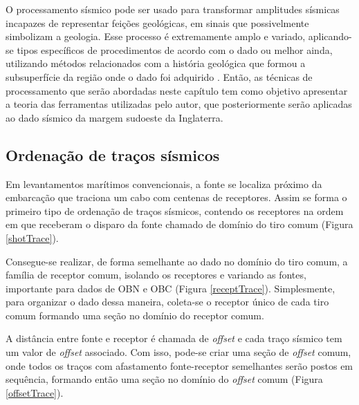 \documentclass[
	12pt,				%
	openright,			%
	oneside,			%
	a4paper,			%
	english,			%
	brazil				%
	]{abntex2}
\begin{document}
    O processamento sísmico pode ser usado para transformar amplitudes sísmicas incapazes de representar feições geológicas, em sinais que possivelmente simbolizam a geologia. Esse processo é extremamente amplo e variado, aplicando-se tipos específicos de procedimentos de acordo com o dado ou melhor ainda, utilizando métodos relacionados com a história geológica que formou a subsuperfície da região onde o dado foi adquirido \cite{yilmaz2001seismic}. Então, as técnicas de processamento que serão abordadas neste capítulo tem como objetivo apresentar a teoria das ferramentas utilizadas pelo autor, que posteriormente serão aplicadas ao dado sísmico da margem sudoeste da Inglaterra.   
	
    \subsection*{Ordenação de traços sísmicos}

    Em levantamentos marítimos convencionais, a fonte se localiza próximo da embarcação que traciona um cabo com centenas de receptores. Assim se forma o primeiro tipo de ordenação de traços sísmicos, contendo os receptores na ordem em que receberam o disparo da fonte chamado de domínio do tiro comum (Figura \ref{shotTrace}).
        
    Consegue-se realizar, de forma semelhante ao dado no domínio do tiro comum, a família de receptor comum, isolando os receptores e variando as fontes, importante para dados de OBN e OBC (Figura \ref{receptTrace}). Simplesmente, para organizar o dado dessa maneira, coleta-se o receptor único de cada tiro comum formando uma seção no domínio do receptor comum.   
    
    A distância entre fonte e receptor é chamada de \textit{offset} e cada traço sísmico tem um valor de \textit{offset} associado. Com isso, pode-se criar uma seção de \textit{offset} comum, onde todos os traços com afastamento fonte-receptor semelhantes serão postos em sequência, formando então uma seção no domínio do \textit{offset} comum (Figura \ref{offsetTrace}).  
\end{document}
